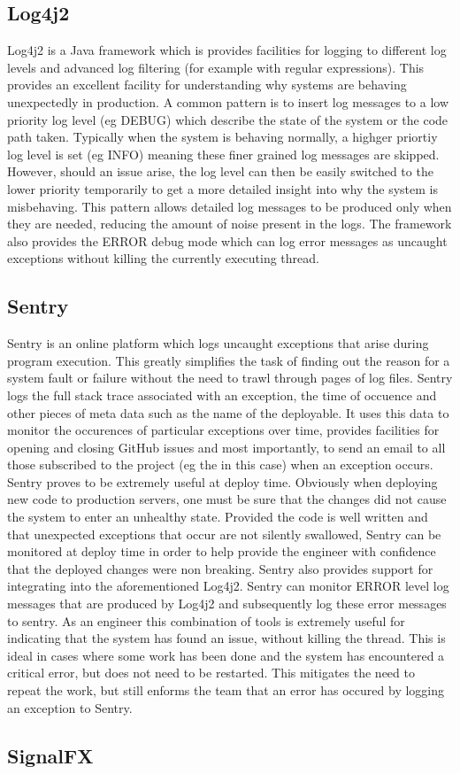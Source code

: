 \subsection{Log4j2\cite{log4j2}}
Log4j2 is a Java framework which is provides facilities for logging to different log levels and advanced log filtering (for example with regular expressions). This provides an excellent facility for understanding why systems are behaving unexpectedly in production. A common pattern is to insert log messages to a low priority log level (eg DEBUG) which describe the state of the system or the code path taken. Typically when the system is behaving normally, a highger priortiy log level is set (eg INFO) meaning these finer grained log messages are skipped. However, should an issue arise, the log level can then be easily switched to the lower priority temporarily to get a more detailed insight into why the system is misbehaving. This pattern allows detailed log messages to be produced only when they are needed, reducing the amount of noise present in the logs. The framework also provides the ERROR debug mode which can log error messages as uncaught exceptions without killing the currently executing thread.

\subsection{Sentry\cite{sentry}}
Sentry is an online platform which logs uncaught exceptions that arise during program execution. This greatly simplifies the task of finding out the reason for a system fault or failure without the need to trawl through pages of log files. Sentry logs the full stack trace associated with an exception, the time of occuence and other pieces of meta data such as the name of the deployable. It uses this data to monitor the occurences of particular exceptions over time, provides facilities for opening and closing GitHub issues and most importantly, to send an email to all those subscribed to the project (eg the \team{} in this case) when an exception occurs. Sentry proves to be extremely useful at deploy time. Obviously when deploying new code to production servers, one must be sure that the changes did not cause the system to enter an unhealthy state. Provided the code is well written and that unexpected exceptions that occur are not silently swallowed, Sentry can be monitored at deploy time in order to help provide the engineer with confidence that the deployed changes were non breaking. Sentry also provides support for integrating into the aforementioned Log4j2. Sentry can monitor ERROR level log messages that are produced by Log4j2 and subsequently log these error messages to sentry. As an engineer this combination of tools is extremely useful for indicating that the system has found an issue, without killing the thread. This is ideal in cases where some work has been done and the system has encountered a critical error, but does not need to be restarted. This mitigates the need to repeat the work, but still enforms the team that an error has occured by logging an exception to Sentry.

\subsection{SignalFX\cite{sigfx}}
